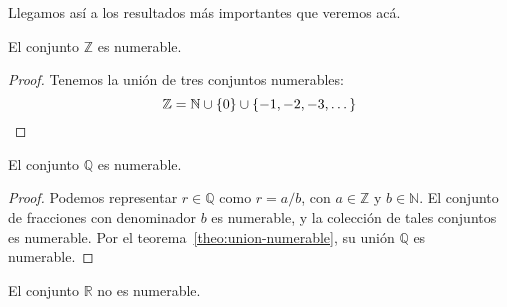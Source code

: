   Llegamos así a los resultados más importantes que veremos acá.
  \begin{theorem}
    \label{theo:Z-numerable}
    El conjunto \(\mathbb{Z}\) es numerable.
  \end{theorem}
  \begin{proof}
    Tenemos la unión de tres conjuntos numerables:
    \begin{equation*}
      \mathbb{Z} = \mathbb{N} \cup \{0\} \cup \{-1, -2, -3, \dotsc\}
      \qedhere
    \end{equation*}
  \end{proof}
  \begin{theorem}
    \label{theo:Q-numerable}
    El conjunto \(\mathbb{Q}\) es numerable.
  \end{theorem}
  \begin{proof}
    Podemos representar \(r \in \mathbb{Q}\) como \(r = a / b\),
    con \(a \in \mathbb{Z}\) y \(b \in \mathbb{N}\).
    El conjunto de fracciones con denominador \(b\) es numerable,
    y la colección de tales conjuntos es numerable.
    Por el teorema~\ref{theo:union-numerable},
    su unión \(\mathbb{Q}\) es numerable.
  \end{proof}
  \begin{theorem}[Cantor]
    \label{theo:R-no-numerable}
    El conjunto \(\mathbb{R}\) no es numerable.
  \end{theorem}
